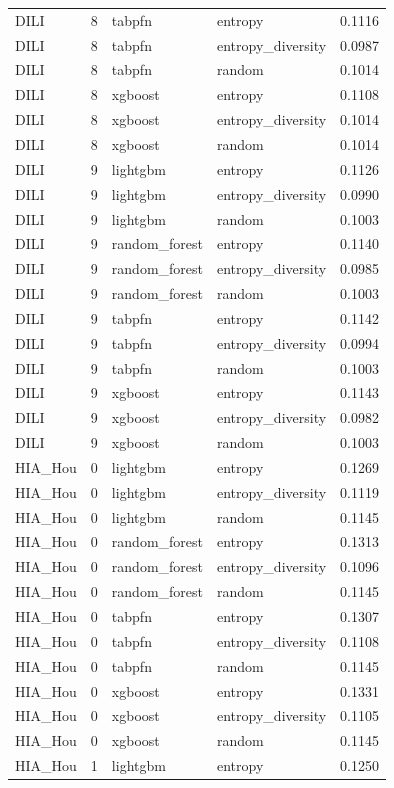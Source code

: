 \begin{tabular}{lrllr}
DILI & 8 & tabpfn & entropy & 0.1116 \\
DILI & 8 & tabpfn & entropy_diversity & 0.0987 \\
DILI & 8 & tabpfn & random & 0.1014 \\
DILI & 8 & xgboost & entropy & 0.1108 \\
DILI & 8 & xgboost & entropy_diversity & 0.1014 \\
DILI & 8 & xgboost & random & 0.1014 \\
DILI & 9 & lightgbm & entropy & 0.1126 \\
DILI & 9 & lightgbm & entropy_diversity & 0.0990 \\
DILI & 9 & lightgbm & random & 0.1003 \\
DILI & 9 & random_forest & entropy & 0.1140 \\
DILI & 9 & random_forest & entropy_diversity & 0.0985 \\
DILI & 9 & random_forest & random & 0.1003 \\
DILI & 9 & tabpfn & entropy & 0.1142 \\
DILI & 9 & tabpfn & entropy_diversity & 0.0994 \\
DILI & 9 & tabpfn & random & 0.1003 \\
DILI & 9 & xgboost & entropy & 0.1143 \\
DILI & 9 & xgboost & entropy_diversity & 0.0982 \\
DILI & 9 & xgboost & random & 0.1003 \\
HIA_Hou & 0 & lightgbm & entropy & 0.1269 \\
HIA_Hou & 0 & lightgbm & entropy_diversity & 0.1119 \\
HIA_Hou & 0 & lightgbm & random & 0.1145 \\
HIA_Hou & 0 & random_forest & entropy & 0.1313 \\
HIA_Hou & 0 & random_forest & entropy_diversity & 0.1096 \\
HIA_Hou & 0 & random_forest & random & 0.1145 \\
HIA_Hou & 0 & tabpfn & entropy & 0.1307 \\
HIA_Hou & 0 & tabpfn & entropy_diversity & 0.1108 \\
HIA_Hou & 0 & tabpfn & random & 0.1145 \\
HIA_Hou & 0 & xgboost & entropy & 0.1331 \\
HIA_Hou & 0 & xgboost & entropy_diversity & 0.1105 \\
HIA_Hou & 0 & xgboost & random & 0.1145 \\
HIA_Hou & 1 & lightgbm & entropy & 0.1250 \\

\end{tabular}

